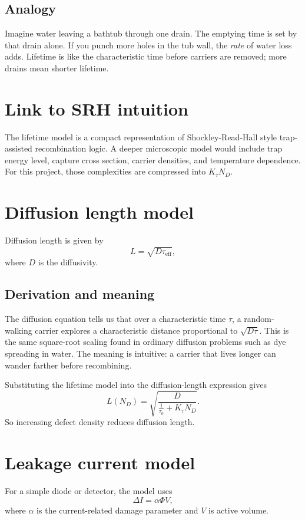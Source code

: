 \documentclass[11pt]{article}
\newcommand{\taueff}{\tau_\mathrm{eff}}
\begin{document}
\subsection{Analogy}
Imagine water leaving a bathtub through one drain. The emptying time is set by that drain alone. If you punch more holes in the tub wall, the \emph{rate} of water loss adds. Lifetime is like the characteristic time before carriers are removed; more drains mean shorter lifetime.

\section{Link to SRH intuition}
The lifetime model is a compact representation of Shockley-Read-Hall style trap-assisted recombination logic. A deeper microscopic model would include trap energy level, capture cross section, carrier densities, and temperature dependence. For this project, those complexities are compressed into $K_\tau N_D$.

\section{Diffusion length model}
Diffusion length is given by
\begin{equation}
L = \sqrt{D\taueff},
\end{equation}
where $D$ is the diffusivity.

\subsection{Derivation and meaning}
The diffusion equation tells us that over a characteristic time $\tau$, a random-walking carrier explores a characteristic distance proportional to $\sqrt{D\tau}$. This is the same square-root scaling found in ordinary diffusion problems such as dye spreading in water. The meaning is intuitive: a carrier that lives longer can wander farther before recombining.

Substituting the lifetime model into the diffusion-length expression gives
\begin{equation}
L(N_D) = \sqrt{\frac{D}{\frac{1}{\tau_0}+K_\tau N_D}}.
\end{equation}
So increasing defect density reduces diffusion length.

\section{Leakage current model}
For a simple diode or detector, the model uses
\begin{equation}
\Delta I = \alpha \Phi V,
\end{equation}
where $\alpha$ is the current-related damage parameter and $V$ is active volume.
\end{document}
